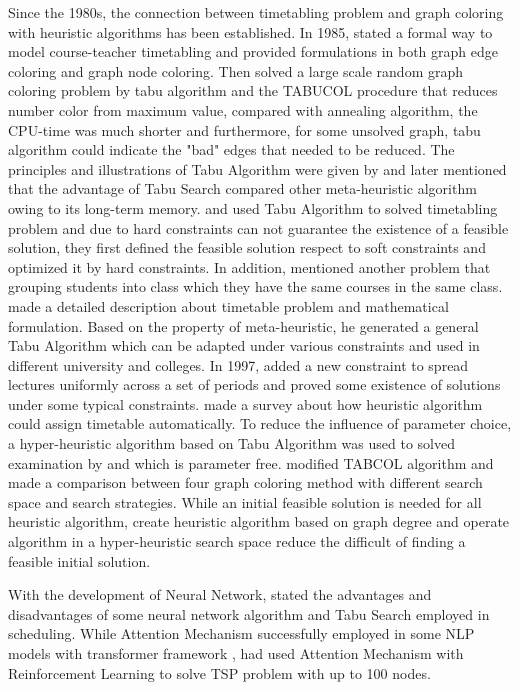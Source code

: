 \documentclass{article}
\begin{document}
Since the 1980s, the connection between timetabling problem and graph coloring with heuristic algorithms has been established. In 1985, \citet{(werra1985)introduction} stated a formal way to model course-teacher timetabling and provided formulations in both graph edge coloring and graph node coloring. Then \cite{(hertz1987)using} solved a large scale random graph coloring problem by tabu algorithm and the TABUCOL procedure that reduces number color from maximum value, compared with annealing algorithm, the CPU-time was much shorter and furthermore, for some unsolved graph, tabu algorithm could indicate the "bad" edges that needed to be reduced. The principles and illustrations of Tabu Algorithm were given by \cite{(werra1989)tabu} and later \cite{(glover1990)tabu} mentioned that the advantage of Tabu Search compared other meta-heuristic algorithm owing to its long-term memory. \cite{(hertz1991)tabu} and \cite{(tuga2007)hybrid} used Tabu Algorithm to solved timetabling problem and due to hard constraints can not guarantee the existence of a feasible solution, they first defined the feasible solution respect to soft constraints and optimized it by hard constraints. In addition, \cite{(hertz1991)tabu} mentioned another problem that grouping students into class which they have the same courses in the same class. \cite{(costa1994)tabu} made a detailed description about timetable problem and mathematical formulation. Based on the property of meta-heuristic, he generated a general Tabu Algorithm which can be adapted under various constraints and used in different university and colleges. In 1997, \cite{(werra1997)combinatorics} added a new constraint to spread lectures uniformly across a set of periods and proved some existence of solutions under some typical constraints. \cite{(schaerf1999)survey} made a survey about how heuristic algorithm could assign timetable automatically. To reduce the influence of parameter choice, a hyper-heuristic algorithm based on Tabu Algorithm was used to solved examination by \cite{(hussin2005)tabu} and \cite{(kendall2005)investigation} which is parameter free. \cite{(galinier2006)survey} modified TABCOL algorithm and made a comparison between four graph coloring method with different search space and search strategies. While an initial feasible solution is needed for all heuristic algorithm, \cite{(burke2007)graphbased} create heuristic algorithm based on graph degree and operate algorithm in a hyper-heuristic search space reduce the difficult of finding a feasible initial solution.

With the development of Neural Network, \cite{(fazelzarandi2020)state} stated the advantages and disadvantages of some neural network algorithm and Tabu Search employed in scheduling. While Attention Mechanism successfully employed in some NLP models with transformer framework \citep{(ashishvaswani2017)attention,(devlin2019)bert}, \cite{(kool2019)attention} had used Attention Mechanism with Reinforcement Learning to solve TSP problem with up to 100 nodes.
\end{document}

